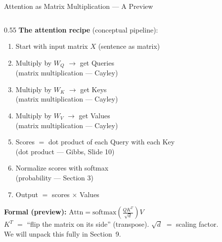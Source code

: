 \begin{frame}[shrink=25]{Attention as Matrix Multiplication --- A Preview}

  \begin{columns}[T]
    \begin{column}{0.55\textwidth}
      \textbf{The attention recipe} (conceptual pipeline):

      \vspace{0.3em}
      \begin{enumerate}
        \item Start with input matrix $X$ (sentence as matrix)
        \item Multiply by $W_Q$ $\to$ get Queries\\
              {\scriptsize (matrix multiplication --- Cayley)}
        \item Multiply by $W_K$ $\to$ get Keys\\
              {\scriptsize (matrix multiplication --- Cayley)}
        \item Multiply by $W_V$ $\to$ get Values\\
              {\scriptsize (matrix multiplication --- Cayley)}
        \item Scores $=$ dot product of each Query with each Key\\
              {\scriptsize (dot product --- Gibbs, Slide 10)}
        \item Normalize scores with softmax\\
              {\scriptsize (probability --- Section 3)}
        \item Output $=$ scores $\times$ Values
      \end{enumerate}

      \vspace{0.3em}
      {\footnotesize\colorbox{digitalBlue!8}{\parbox{0.92\linewidth}{%
        \textbf{Formal (preview):}\quad
        $\text{Attn} = \text{softmax}\!\left(\frac{QK^T}{\sqrt{d}}\right) V$\\[2pt]
        $K^T$ $=$ ``flip the matrix on its side'' (transpose).
        $\sqrt{d}$ $=$ scaling factor.\\
        We will unpack this fully in Section~9.}}}
    \end{column}


\end{columns}
\end{frame}
